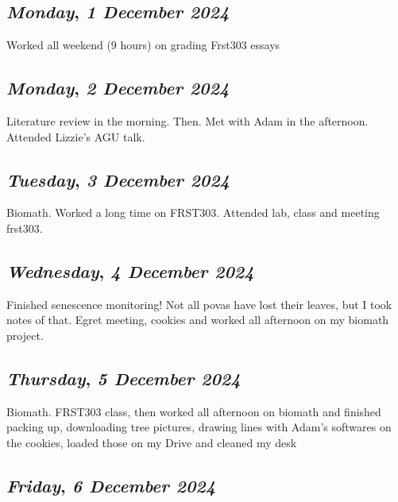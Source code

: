 \begin{center}
\section*{\month}
\end{center}

\def\day{\textit{1 December 2024}}
\def\weekday{\textit{Monday}}
\subsection*{\weekday, \day}
Worked all weekend (9 hours) on grading Frst303 essays
\def\day{\textit{2 December 2024}}
\def\weekday{\textit{Monday}}
\subsection*{\weekday, \day}
Literature review in the morning. Then. Met with Adam in the afternoon. Attended Lizzie's AGU talk. 

\def\day{\textit{3 December 2024}}
\def\weekday{\textit{Tuesday}}
\subsection*{\weekday, \day}
Biomath. Worked a long time on FRST303. Attended lab, class and meeting frst303.

\def\day{\textit{4 December 2024}}
\def\weekday{\textit{Wednesday}}
\subsection*{\weekday, \day}
Finished senescence monitoring! Not all povas have lost their leaves, but I took notes of that. Egret meeting, cookies and worked all afternoon on my biomath project.

\def\day{\textit{5 December 2024}}
\def\weekday{\textit{Thursday}}
\subsection*{\weekday, \day}
Biomath. FRST303 class, then worked all afternoon on biomath and finished packing up, downloading tree pictures, drawing lines with Adam's softwares on the cookies, loaded those on my Drive and cleaned my desk

\def\day{\textit{6 December 2024}}
\def\weekday{\textit{Friday}}
\subsection*{\weekday, \day}


